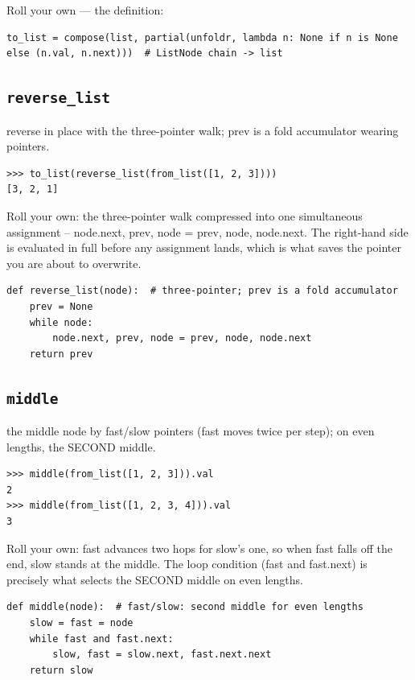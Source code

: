 \documentclass[10pt,letterpaper]{book}
\begin{document}
Roll your own --- the definition:

\begin{lstlisting}[style=ex]
to_list = compose(list, partial(unfoldr, lambda n: None if n is None else (n.val, n.next)))  # ListNode chain -> list
\end{lstlisting}

\subsection{\texttt{reverse\_list}}\label{def:reverse-list}
reverse in place with the three-pointer walk; prev is a fold accumulator wearing pointers.
\begin{lstlisting}[style=ex]
>>> to_list(reverse_list(from_list([1, 2, 3])))
[3, 2, 1]
\end{lstlisting}

Roll your own: the three-pointer walk compressed into one simultaneous assignment -- node.next, prev, node = prev, node, node.next. The right-hand side is evaluated in full before any assignment lands, which is what saves the pointer you are about to overwrite.

\begin{lstlisting}[style=ex]
def reverse_list(node):  # three-pointer; prev is a fold accumulator
    prev = None
    while node:
        node.next, prev, node = prev, node, node.next
    return prev
\end{lstlisting}
\subsection{\texttt{middle}}\label{def:middle}
the middle node by fast/slow pointers (fast moves twice per step); on even lengths, the SECOND middle.
\begin{lstlisting}[style=ex]
>>> middle(from_list([1, 2, 3])).val
2
>>> middle(from_list([1, 2, 3, 4])).val
3
\end{lstlisting}

Roll your own: fast advances two hops for slow's one, so when fast falls off the end, slow stands at the middle. The loop condition (fast and fast.next) is precisely what selects the SECOND middle on even lengths.

\begin{lstlisting}[style=ex]
def middle(node):  # fast/slow: second middle for even lengths
    slow = fast = node
    while fast and fast.next:
        slow, fast = slow.next, fast.next.next
    return slow
\end{lstlisting}
\end{document}
